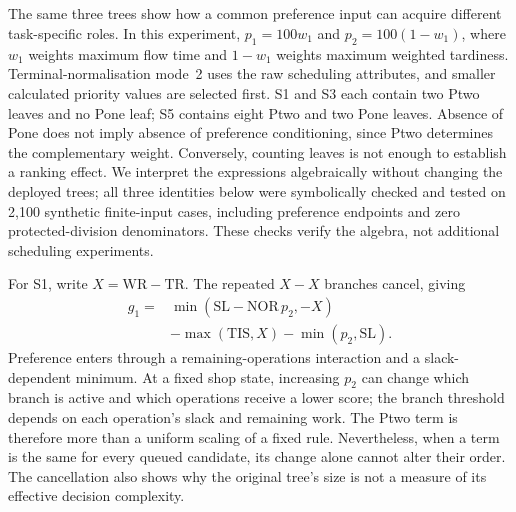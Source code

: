 \subsection{}
\label{sec:tree-preference-effects}
The same three trees show how a common preference input can acquire different task-specific roles. In this experiment, $p_1=100w_1$ and $p_2=100(1-w_1)$, where $w_1$ weights maximum flow time and $1-w_1$ weights maximum weighted tardiness. Terminal-normalisation mode~2 uses the raw scheduling attributes, and smaller calculated priority values are selected first. S1 and S3 each contain two Ptwo leaves and no Pone leaf; S5 contains eight Ptwo and two Pone leaves. Absence of Pone does not imply absence of preference conditioning, since Ptwo determines the complementary weight. Conversely, counting leaves is not enough to establish a ranking effect. We interpret the expressions algebraically without changing the deployed trees; all three identities below were symbolically checked and tested on 2,100 synthetic finite-input cases, including preference endpoints and zero protected-division denominators. These checks verify the algebra, not additional scheduling experiments.

For S1, write $X=\mathrm{WR}-\mathrm{TR}$. The repeated $X-X$ branches cancel, giving
\begin{equation}
\begin{aligned}
g_1={}&\min(\mathrm{SL}-\mathrm{NOR}\,p_2,-X)\\
&-\max(\mathrm{TIS},X)-\min(p_2,\mathrm{SL}).
\end{aligned}
\label{eq:case-tree-s1}
\end{equation}
Preference enters through a remaining-operations interaction and a slack-dependent minimum. At a fixed shop state, increasing $p_2$ can change which branch is active and which operations receive a lower score; the branch threshold depends on each operation's slack and remaining work. The Ptwo term is therefore more than a uniform scaling of a fixed rule. Nevertheless, when a term is the same for every queued candidate, its change alone cannot alter their order. The cancellation also shows why the original tree's size is not a measure of its effective decision complexity.

